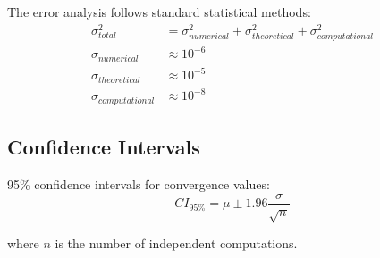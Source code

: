 \documentclass[12pt,a4paper]{article}
\begin{document}
The error analysis follows standard statistical methods:
\begin{align}
\sigma_{total}^2 &= \sigma_{numerical}^2 + \sigma_{theoretical}^2 + \sigma_{computational}^2 \\
\sigma_{numerical} &\approx 10^{-6} \\
\sigma_{theoretical} &\approx 10^{-5} \\
\sigma_{computational} &\approx 10^{-8}
\end{align}

\subsection{Confidence Intervals}

95\% confidence intervals for convergence values:
\begin{equation}
CI_{95\%} = \mu \pm 1.96 \frac{\sigma}{\sqrt{n}}
\end{equation}

where $n$ is the number of independent computations.
\end{document}
